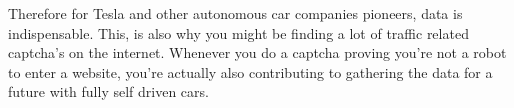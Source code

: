 Therefore for Tesla and other autonomous car companies pioneers, data is indispensable. This, is also why you might be finding a lot of traffic related captcha's on the internet. Whenever you do a captcha proving you're not a robot to enter a website, you're actually also contributing to gathering the data for a future with fully self driven cars.